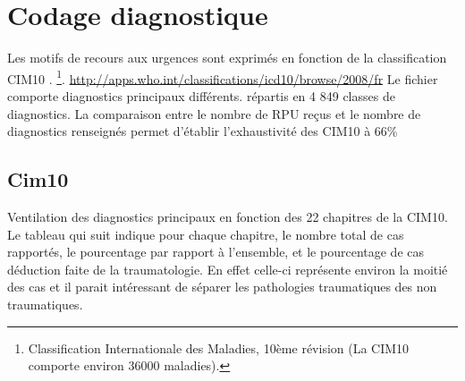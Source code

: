 \documentclass[12pt,english,french,twoside]{book}\usepackage[]{graphicx}\usepackage[]{color}
\begin{document}


\newpage
\chapter{Codage diagnostique}

%




Les motifs de recours aux urgences sont exprimés en fonction de la classification CIM10 \cite{10}.
\footnote{Classification Internationale des Maladies, 10ème révision (La CIM10 comporte environ 36000 maladies).}.
\url{http://apps.who.int/classifications/icd10/browse/2008/fr}
Le fichier comporte  diagnostics principaux différents.
répartis en 4 849 classes de diagnostics.
La comparaison entre le nombre de RPU reçus et le nombre de diagnostics renseignés permet d'établir l'exhaustivité des CIM10 à 66\% 


\section{Cim10}

Ventilation des diagnostics principaux en fonction des 22 chapitres de la CIM10. Le tableau qui suit indique pour chaque chapitre, le nombre total de cas rapportés, le pourcentage par rapport à l'ensemble, et le pourcentage de cas déduction faite de la traumatologie. En effet celle-ci représente environ la moitié des cas et il parait intéressant de séparer les pathologies traumatiques des non traumatiques.





\end{document}
